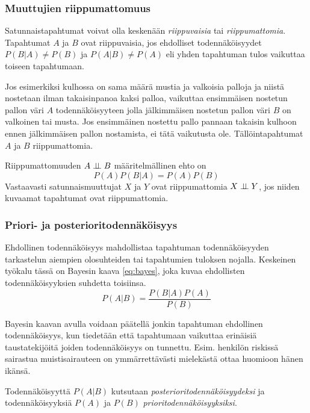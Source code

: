 \subsubsection{Muuttujien riippumattomuus}
Satunnaistapahtumat voivat olla keskenään \emph{riippuvaisia} tai \emph{riippumattomia}. Tapahtumat $A$ ja $B$ ovat riippuvaisia, jos ehdolliset todennäköisyydet $P(B|A) \not= P(B)$ ja $P(A|B) \not= P(A)$ eli yhden tapahtuman tulos vaikuttaa toiseen tapahtumaan.

Jos esimerkiksi  kulhossa on sama määrä mustia ja valkoisia palloja ja niistä nostetaan ilman takaisinpanoa kaksi palloa, vaikuttaa ensimmäisen nostetun pallon väri $A$ todennäköisyyteen jolla jälkimmäisen nostetun pallon väri $B$ on valkoinen tai musta. Jos ensimmäinen nostettu pallo pannaan takaisin kulhoon ennen jälkimmäisen pallon nostamista, ei tätä vaikutusta ole. Tällöintapahtumat $A$ ja $B$ riippumattomia. 

Riippumattomuuden $A \perp \!\!\! \perp B$ määritelmällinen ehto on
$$
    P(A)P(B|A) = P(A)P(B) 
$$ 
Vastaavasti satunnaismuuttujat $X$ ja $Y$ ovat riippumattomia $X \perp \!\!\! \perp Y$, jos niiden kuvaamat tapahtumat ovat riippumattomia. 



\subsubsection{Priori- ja posterioritodennäköisyys}
Ehdollinen todennäköisyys mahdollistaa  tapahtuman todennäköisyyden tarkastelun aiempien olosuhteiden tai tapahtumien tuloksen nojalla. Keskeinen työkalu tässä on Bayesin kaava \ref{eq:bayes}, joka kuvaa ehdollisten todennäköisyyksien suhdetta toisiinsa.
\begin{equation}\label{eq:bayes}
        P(A|B) = \frac{P(B|A)P(A)}{P(B)}
\end{equation}

Bayesin kaavan avulla voidaan päätellä jonkin tapahtuman ehdollinen todennäköisyys, kun tiedetään että tapahtumaan vaikuttaa erinäisiä taustatekijöitä joiden todennäköisyys on tunnettu. Esim. henkilön riskissä sairastua muistisairauteen on ymmärrettävästi mielekästä ottaa huomioon hänen ikänsä.

Todennäköisyyttä $P(A|B)$ kutsutaan \emph{posterioritodennäköisyydeksi} ja todennäköisyyksiä $P(A)$ ja $P(B)$ \emph{prioritodennäköisyyksiksi}.



 

